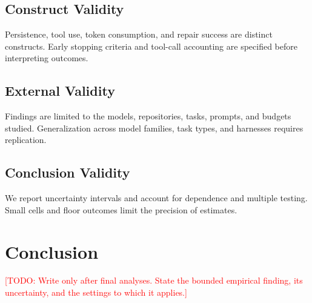 \documentclass[journal]{IEEEtran}
\newcommand{\TODO}[1]{\textcolor{red}{[TODO: #1]}}
\begin{document}
\subsection{Construct Validity}
Persistence, tool use, token consumption, and repair success are distinct constructs. Early stopping criteria and tool-call accounting are specified before interpreting outcomes.

\subsection{External Validity}
Findings are limited to the models, repositories, tasks, prompts, and budgets studied. Generalization across model families, task types, and harnesses requires replication.

\subsection{Conclusion Validity}
We report uncertainty intervals and account for dependence and multiple testing. Small cells and floor outcomes limit the precision of estimates.

\section{Conclusion}
\TODO{Write only after final analyses. State the bounded empirical finding, its uncertainty, and the settings to which it applies.}



\end{document}
